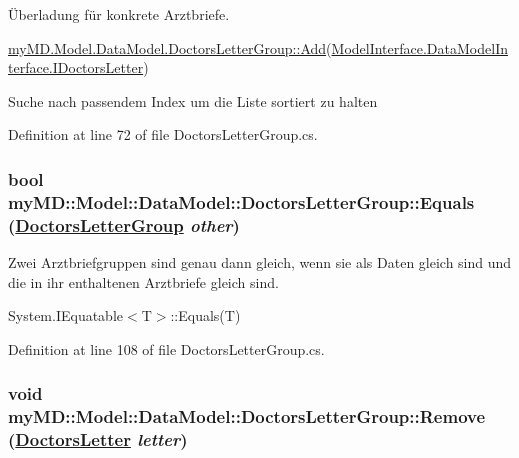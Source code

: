 \"{U}berladung f\"{u}r konkrete Arztbriefe. 

\hyperlink{classmy_m_d_1_1_model_1_1_data_model_1_1_doctors_letter_group_6de945f2b75d0439ee78a7a0aa5f3856}{my\-MD.Model.Data\-Model.Doctors\-Letter\-Group::Add}(\hyperlink{interfacemy_m_d_1_1_model_interface_1_1_data_model_interface_1_1_i_doctors_letter}{Model\-Interface.Data\-Model\-Interface.IDoctors\-Letter})

Suche nach passendem Index um die Liste sortiert zu halten 

Definition at line 72 of file Doctors\-Letter\-Group.cs.\hypertarget{classmy_m_d_1_1_model_1_1_data_model_1_1_doctors_letter_group_05784e1ab10caf01314e691349e68e2e}{
\subsubsection[Equals]{\setlength{\rightskip}{0pt plus 5cm}bool my\-MD::Model::Data\-Model::Doctors\-Letter\-Group::Equals (\hyperlink{classmy_m_d_1_1_model_1_1_data_model_1_1_doctors_letter_group}{Doctors\-Letter\-Group} {\em other})}}
\label{db/dfe/classmy_m_d_1_1_model_1_1_data_model_1_1_doctors_letter_group_05784e1ab10caf01314e691349e68e2e}


Zwei Arztbriefgruppen sind genau dann gleich, wenn sie als Daten gleich sind und die in ihr enthaltenen Arztbriefe gleich sind. 

System.IEquatable$<$T$>$::Equals(T) 

Definition at line 108 of file Doctors\-Letter\-Group.cs.\hypertarget{classmy_m_d_1_1_model_1_1_data_model_1_1_doctors_letter_group_f605263c549fdd56e71759fcd7d2c552}{
\subsubsection[Remove]{\setlength{\rightskip}{0pt plus 5cm}void my\-MD::Model::Data\-Model::Doctors\-Letter\-Group::Remove (\hyperlink{classmy_m_d_1_1_model_1_1_data_model_1_1_doctors_letter}{Doctors\-Letter} {\em letter})}}
\label{db/dfe/classmy_m_d_1_1_model_1_1_data_model_1_1_doctors_letter_group_f605263c549fdd56e71759fcd7d2c552}


